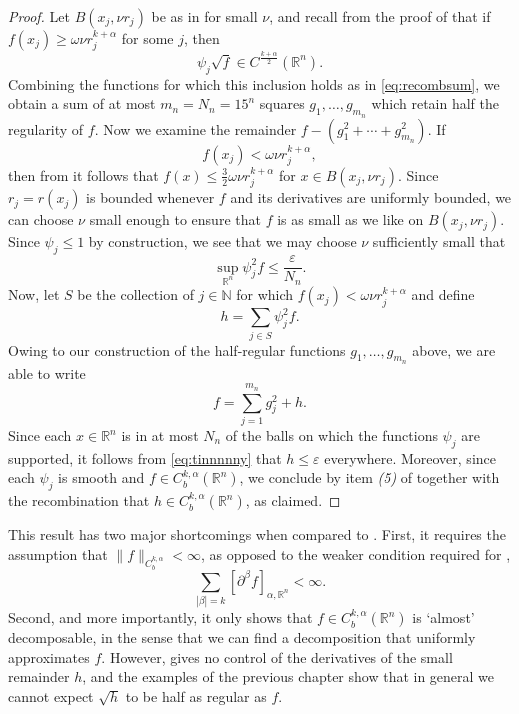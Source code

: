 \documentclass[oneside,hidelinks,indentfirst,10pt]{book}
\begin{document}
\begin{proof}
Let \(B(x_j,\nu r_j)\) be as in  for small \(\nu\), and recall from the proof of  that if \(f(x_j)\geq \omega\nu r_j^{k+\alpha}\) for some \(j\), then 
\[
    \psi_j\sqrt{f}\in C^\frac{k+\alpha}{2}(\mathbb{R}^n).
\]
Combining the functions for which this inclusion holds as in \eqref{eq:recombsum}, we obtain a sum of at most \(m_n=N_n=15^n\) squares \(g_1,\dots,g_{m_n}\) which retain half the regularity of \(f\). Now we examine the remainder \(f-(g_1^2+\cdots+g_{m_n}^2)\). If
\[
    f(x_j)<\omega\nu r_j^{k+\alpha}, 
\]
then from  it follows that \(f(x)\leq \frac{3}{2}\omega\nu r_j^{k+\alpha}\) for \(x\in B(x_j,\nu r_j)\). Since \(r_j=r(x_j)\) is bounded whenever \(f\) and its derivatives are uniformly bounded, we can choose \(\nu\) small enough to ensure that \(f\) is as small as we like on \(B(x_j,\nu r_j)\). Since \(\psi_j\leq 1\) by construction, we see that we may choose \(\nu\) sufficiently small that
\begin{equation}\label{eq:tinnnnny}
    \sup_{\mathbb{R}^n}\psi_j^2f\leq \frac{\varepsilon}{N_n}.
\end{equation}
Now, let \(S\) be the collection of \(j\in\mathbb{N}\) for which \(f(x_j)<\omega\nu r_j^{k+\alpha}\) and define
\[
    h=\sum_{j\in S}\psi_j^2 f.
\]
Owing to our construction of the half-regular functions \(g_1,\dots,g_{m_n}\) above, we are able to write
\[
    f=\sum_{j=1}^{m_n}g_j^2+h.
\]
Since each \(x\in\mathbb{R}^n\) is in at most \(N_n\) of the balls on which the functions \(\psi_j\) are supported, it follows from \eqref{eq:tinnnnny} that \(h\leq \varepsilon\) everywhere. Moreover, since each \(\psi_j\) is smooth and \(f\in C_b^{k,\alpha}(\mathbb{R}^n)\), we conclude by item \textit{(5)} of  together with the recombination  that \(h\in C_b^{k,\alpha}(\mathbb{R}^n)\), as claimed.
\end{proof}


This result has two major shortcomings when compared to . First, it requires the assumption that \(\|f\|_{C_b^{k,\alpha}}<\infty\), as opposed to the weaker condition required for ,
\[
    \sum_{|\beta|=k}[\partial^\beta f]_{\alpha,\mathbb{R}^n}<\infty.
\]
Second, and more importantly, it only shows that \(f\in C_b^{k,\alpha}(\mathbb{R}^n)\) is `almost' decomposable, in the sense that we can find a decomposition that uniformly approximates \(f\). However,  gives no control of the derivatives of the small remainder \(h\), and the examples of the previous chapter show that in general we cannot expect \(\sqrt{h}\) to be half as regular as \(f\). %
\end{document}
